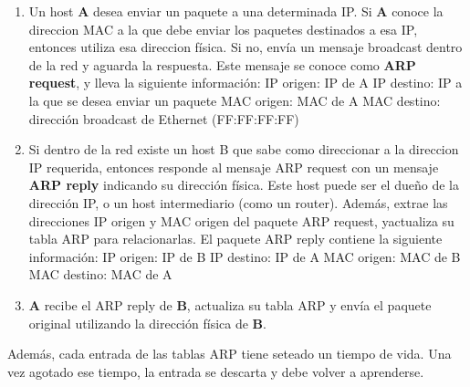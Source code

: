 \begin{enumerate}
	\item Un host \textbf{A} desea enviar un paquete a una determinada IP. Si \textbf{A} conoce la direccion MAC a la que debe enviar los paquetes destinados a esa IP, entonces utiliza esa direccion física. Si no, envía un mensaje broadcast dentro de la red  y aguarda la respuesta. Este mensaje se conoce como \textbf{ARP request}, y lleva la siguiente información:
		\subitem IP origen: IP de A
		\subitem IP destino: IP a la que se desea enviar un paquete
		\subitem MAC origen: MAC de A
		\subitem MAC destino: dirección broadcast de Ethernet (FF:FF:FF:FF)
	\item Si dentro de la red existe un host B que sabe como direccionar a la direccion IP requerida, entonces responde al mensaje ARP request con un mensaje \textbf{ARP reply} indicando su dirección física. Este host puede ser el dueño de la dirección IP, o un host intermediario (como un router). Además, extrae las direcciones IP origen y MAC origen del paquete ARP request, yactualiza su tabla ARP para relacionarlas.
	El paquete ARP reply contiene la siguiente información:
		\subitem IP origen: IP de B
		\subitem IP destino: IP de A
		\subitem MAC origen: MAC de B
		\subitem MAC destino: MAC de A
	\item \textbf{A} recibe el ARP reply de \textbf{B}, actualiza su tabla ARP y envía el paquete original utilizando la dirección física de \textbf{B}.
\end{enumerate}
Además, cada entrada de las tablas ARP tiene seteado un tiempo de vida. Una vez agotado ese tiempo, la entrada se descarta y debe volver a aprenderse. 


